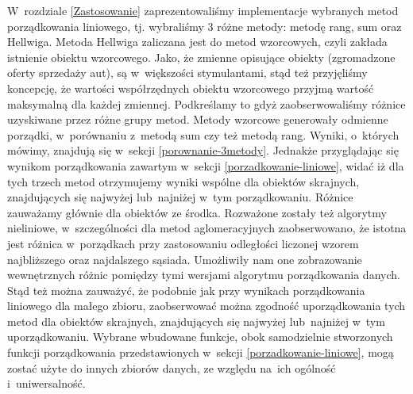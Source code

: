 \documentclass[12pt,a4paper]{report}
\begin{document}
W~rozdziale \ref{Zastosowanie} zaprezentowaliśmy implementacje wybranych metod porządkowania liniowego, tj. wybraliśmy 3 różne metody: metodę rang, sum oraz Hellwiga. Metoda Hellwiga zaliczana jest do metod wzorcowych, czyli zakłada istnienie obiektu wzorcowego. Jako, że zmienne opisujące obiekty (zgromadzone oferty sprzedaży aut), są w~większości stymulantami, stąd też przyjęliśmy koncepcję, że wartości współrzędnych obiektu wzorcowego przyjmą wartość maksymalną dla każdej zmiennej. Podkreślamy to gdyż zaobserwowaliśmy różnice uzyskiwane przez różne grupy metod. Metody wzorcowe generowały odmienne porządki, w~porównaniu z~metodą sum czy też metodą rang. Wyniki, o~których mówimy, znajdują się w~sekcji \ref{porownanie-3metody}. Jednakże przyglądając się wynikom porządkowania zawartym  w~sekcji \ref{porzadkowanie-liniowe}, widać iż dla tych trzech metod otrzymujemy wyniki wspólne dla obiektów skrajnych, znajdujących się najwyżej lub~najniżej w~tym porządkowaniu. Różnice zauważamy głównie dla obiektów ze środka. %
Rozważone zostały też algorytmy nieliniowe, w~szczególności dla metod aglomeracyjnych zaobserwowano, że 
istotna jest różnica w~porządkach przy zastosowaniu odległości liczonej wzorem najbliższego oraz najdalszego sąsiada. Umożliwiły nam one zobrazowanie wewnętrznych różnic pomiędzy tymi wersjami algorytmu porządkowania danych. Stąd też można zauważyć, że podobnie jak przy wynikach porządkowania liniowego dla małego zbioru, zaobserwować można zgodność uporządkowania tych metod dla obiektów skrajnych, znajdujących się najwyżej lub~najniżej w~tym uporządkowaniu.
Wybrane wbudowane funkcje, obok samodzielnie stworzonych funkcji porządkowania przedstawionych w~sekcji \ref{porzadkowanie-liniowe}, mogą zostać użyte do innych zbiorów danych, ze względu na~ich ogólność i~uniwersalność. 
 


\end{document}
